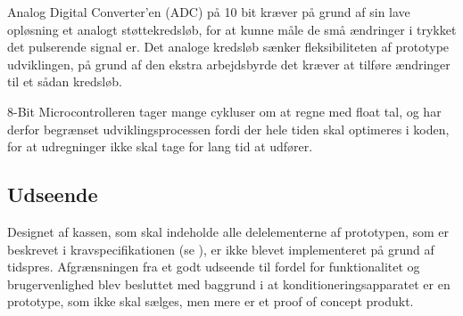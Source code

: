 Analog Digital Converter'en (ADC) på 10 bit kræver på grund af sin lave opløsning et analogt støttekredsløb, for at kunne måle de små ændringer i trykket det pulserende signal er. Det analoge kredsløb sænker fleksibiliteten af prototype udviklingen, på grund af den ekstra arbejdsbyrde det kræver at tilføre ændringer til et sådan kredsløb.

8-Bit Microcontrolleren tager mange cykluser om at regne med float tal, og har derfor begrænset udviklingsprocessen fordi der hele tiden skal optimeres i koden, for at udregninger ikke skal tage for lang tid at udfører.


\subsection{Udseende}
Designet af kassen, som skal indeholde alle delelementerne af prototypen, som er beskrevet i kravspecifikationen (se ), er ikke blevet implementeret på grund af tidspres. Afgrænsningen fra et godt udseende til fordel for funktionalitet og brugervenlighed blev besluttet med baggrund i at konditioneringsapparatet er en prototype, som ikke skal sælges, men mere er et proof of concept produkt. 
